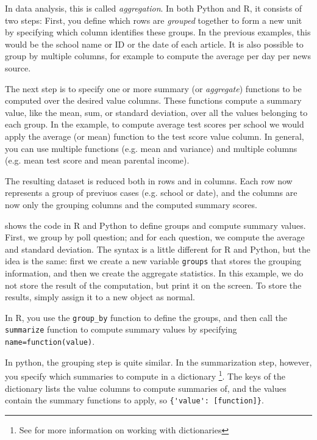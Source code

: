 In data analysis, this is called \emph{aggregation}.
In both Python and R, it consists of two steps:
First, you define which rows are \emph{grouped} together to form a new unit
by specifying which column identifies these groups.
In the previous examples, this would be the school name or ID or the date of each article.
It is also possible to group by multiple columns, for example to compute the average per day per news source.

The next step is to specify one or more summary (or \emph{aggregate}) functions to be computed over the desired value columns.
These functions compute a summary value, like the mean, sum, or standard deviation, over all the values belonging to each group.
In the example, to compute average test scores per school we would apply the average (or mean) function to the test score value column.
In general, you can use multiple functions (e.g.  mean and variance) and multiple columns (e.g. mean test score and mean parental income).

The resulting dataset is reduced both in rows and in columns.
Each row now represents a group of previuos cases (e.g. school or date),
and the columns are now only the grouping columns and the computed summary scores.

 shows the code in R and Python to define groups and compute summary values.
First, we group by poll question; and for each question, we compute the average and standard deviation.
The syntax is a little different for R and Python, but the idea is the same:
first we create a new variable \verb+groups+ that stores the grouping information,
and then we create the aggregate statistics.
In this example, we do not store the result of the computation, but print it on the screen.
To store the results, simply assign it to a new object as normal.


In R, you use the \verb+group_by+ function to define the groups,
and then call the \verb+summarize+ function to compute summary values by specifying
\verb+name=function(value)+.

In python, the grouping step is quite similar.
In the summarization step, however, you specify which summaries to compute in a dictionary%
\footnote{See  for more information on working with dictionaries}.
The keys of the dictionary lists the value columns to compute summaries of,
and the values contain the summary functions to apply, so \verb+{'value': [function]}+.

